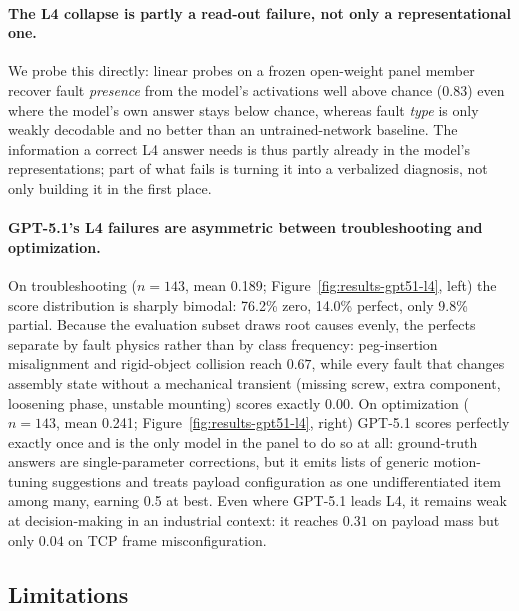 \paragraph{The L4 collapse is partly a read-out failure, not only a representational one.}
We probe this directly: linear probes on a frozen open-weight panel member recover fault \emph{presence} from the model's activations well above chance ($0.83$) even where the model's own answer stays below chance, whereas fault \emph{type} is only weakly decodable and no better than an untrained-network baseline. The information a correct L4 answer needs is thus partly already in the model's representations; part of what fails is turning it into a verbalized diagnosis, not only building it in the first place.

\ifworkshopcompact\else
\paragraph{GPT-5.1's L4 failures are asymmetric between troubleshooting and optimization.}
On troubleshooting ($n{=}143$, mean 0.189; Figure~\ref{fig:results-gpt51-l4}, left) the score distribution is sharply bimodal: 76.2\% zero, 14.0\% perfect, only 9.8\% partial. Because the evaluation subset draws root causes evenly, the perfects separate by fault physics rather than by class frequency: peg-insertion misalignment and rigid-object collision reach $0.67$, while every fault that changes assembly state without a mechanical transient (missing screw, extra component, loosening phase, unstable mounting) scores exactly $0.00$. On optimization ($n{=}143$, mean 0.241; Figure~\ref{fig:results-gpt51-l4}, right) GPT-5.1 scores perfectly exactly once and is the only model in the panel to do so at all: ground-truth answers are single-parameter corrections, but it emits lists of generic motion-tuning suggestions and treats payload configuration as one undifferentiated item among many, earning 0.5 at best. Even where GPT-5.1 leads L4, it remains weak at decision-making in an industrial context: it reaches $0.31$ on payload mass but only $0.04$ on TCP frame misconfiguration.
\fi

\subsection{Limitations}

